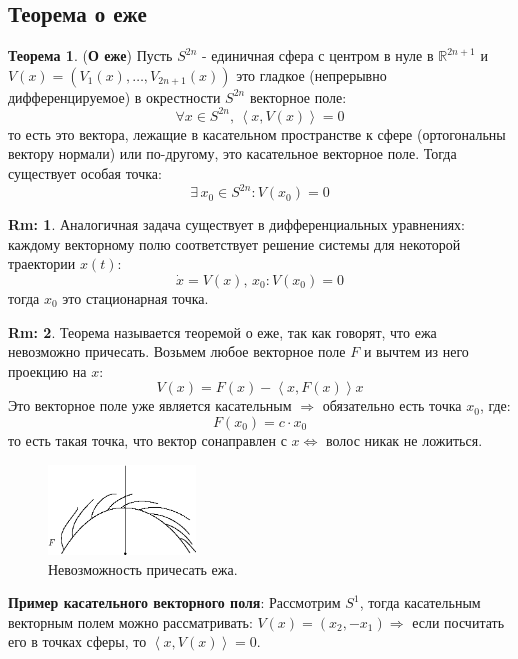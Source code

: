 \documentclass[12pt]{article}
\newcommand{\MR}{\mathbb{R}}
\theoremstyle{definition}
\newtheorem{rem}{Rm:}
\newtheorem{theorem}{Теорема}
\newcommand{\inner}[2]{\left\langle #1, #2 \right\rangle }
\begin{document}
\subsection*{Теорема о еже}
\begin{theorem}(\textbf{О еже})
	Пусть $S^{2n}$ - единичная сфера с центром в нуле в $\MR^{2n + 1}$ и $V(x) = (V_1(x), \dotsc, V_{2n+1}(x))$ это гладкое (непрерывно дифференцируемое) в окрестности $S^{2n}$ векторное поле:
	$$
		\forall x \in S^{2n}, \, \inner{x}{V(x)} = 0
	$$
	то есть это вектора, лежащие в касательном пространстве к сфере (ортогональны вектору нормали) или по-другому, это касательное векторное поле. Тогда существует особая точка: 
	$$
		\exists \, x_0 \in S^{2n} \colon V(x_0) = 0
	$$
\end{theorem}
\begin{rem}
	Аналогичная задача существует в дифференциальных уравнениях: каждому векторному полю соответствует решение системы для некоторой траектории $x(t)$:
	$$
		\dot{x} = V(x), \, x_0 \colon V(x_0) = 0
	$$
	тогда $x_0$ это стационарная точка.
\end{rem}
\begin{rem}
	Теорема называется теоремой о еже, так как говорят, что ежа невозможно причесать. Возьмем любое векторное поле $F$ и вычтем из него проекцию на $x$:
	$$
		V(x) = F(x) - \inner{x}{F(x)}x		
	$$
	Это векторное поле уже является касательным $\Rightarrow$ обязательно есть точка $x_0$, где:
	$$
		F(x_0) = c{\cdot}x_0
	$$
	то есть такая точка, что вектор сонаправлен с $x \Leftrightarrow$ волос никак не ложиться.
	\begin{figure}[H]
		\centering
		\includegraphics[width=0.35\textwidth]{MA4L8_1.eps}
		\caption{Невозможность причесать ежа.}
		\label{8_1}
	\end{figure}
\end{rem}
\textbf{Пример касательного векторного поля}: Рассмотрим $S^1$, тогда касательным векторным полем можно рассматривать: $V(x) = (x_2, -x_1) \Rightarrow$ если посчитать его в точках сферы, то $\inner{x}{V(x)} = 0$. 
\end{document}
